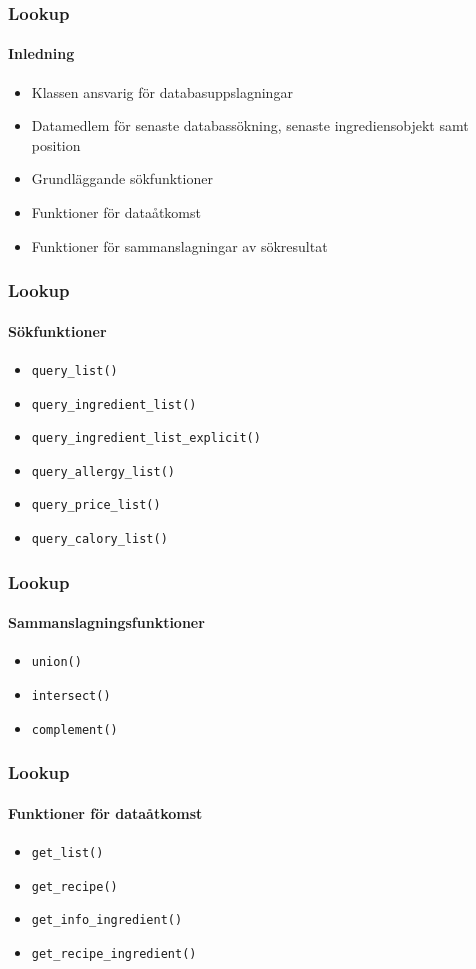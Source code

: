 
\begin{frame}
  \frametitle{Lookup}
  \framesubtitle{Inledning}
  \begin{itemize}
    \item<1-> Klassen ansvarig för databasuppslagningar
    \item<2-> Datamedlem för senaste databassökning, senaste ingrediensobjekt samt position
    \item<3-> Grundläggande sökfunktioner
    \item<4-> Funktioner för dataåtkomst
    \item<5-> Funktioner för sammanslagningar av sökresultat
 \end{itemize}
\end{frame}


\begin{frame}
  \frametitle{Lookup}
  \framesubtitle{Sökfunktioner}
  \begin{itemize}
    \item<1-> \texttt{query\_list()}
    \item<2-> \texttt{query\_ingredient\_list()}
    \item<3-> \texttt{query\_ingredient\_list\_explicit()}
    \item<4-> \texttt{query\_allergy\_list()}
    \item<5-> \texttt{query\_price\_list()}
    \item<6-> \texttt{query\_calory\_list()}
  \end{itemize}
\end{frame}

\begin{frame}
  \frametitle{Lookup}
  \framesubtitle{Sammanslagningsfunktioner}
  \begin{itemize}
    \item<1-> \texttt{union()}
    \item<2-> \texttt{intersect()}
    \item<3-> \texttt{complement()}
  \end{itemize}
\end{frame}

\begin{frame}
  \frametitle{Lookup}
  \framesubtitle{Funktioner för dataåtkomst}
  \begin{itemize}
    \item<1-> \texttt{get\_list()}
    \item<2-> \texttt{get\_recipe()}
    \item<3-> \texttt{get\_info\_ingredient()}
    \item<4-> \texttt{get\_recipe\_ingredient()}
  \end{itemize}
\end{frame}


